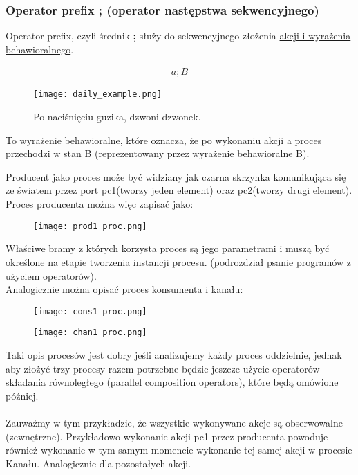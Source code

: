 \documentclass[a4paper,15pt]{article}
\newcommand{\example}[2]{
    \begin{tcolorbox}[colback=blue!5!white,colframe=blue,title={Przykład #1}]
        #2
    \end{tcolorbox}
}
\begin{document}
\newpage
\subsubsection{Operator prefix ; (operator następstwa sekwencyjnego)}
Operator prefix, czyli średnik \textbf{;} służy do sekwencyjnego złożenia \underline{akcji i wyrażenia behawioralnego}.
\example{}{
\begin{align*}
a; B
\end{align*}

\begin{figure}[H]
\centerline{\texttt{[image: daily\_example.png]}}
\caption{Po naciśnięciu guzika, dzwoni dzwonek.}
\label{fig:daily_example}
\end{figure}

To wyrażenie behawioralne, które oznacza, że po wykonaniu akcji a proces przechodzi w stan B (reprezentowany przez wyrażenie behawioralne B).
}

Producent jako proces może być widziany jak czarna skrzynka komunikująca się ze światem przez port pc1(tworzy jeden element) oraz pc2(tworzy drugi element). Proces producenta można więc zapisać jako:
\begin{figure}[H]
\centerline{\texttt{[image: prod1\_proc.png]}}
\label{fig:prod1_proc}
\end{figure}
Właściwe bramy z których korzysta proces są jego parametrami i muszą być określone na etapie tworzenia instancji procesu. (podrozdział psanie programów z użyciem operatorów). \\
Analogicznie można opisać proces konsumenta i kanału:
\begin{figure}[H]
\centerline{\texttt{[image: cons1\_proc.png]}}
\label{fig:cons1_proc}
\end{figure}
\begin{figure}[H]
\centerline{\texttt{[image: chan1\_proc.png]}}
\label{fig:chan1_proc}
\end{figure}
Taki opis procesów jest dobry jeśli analizujemy każdy proces oddzielnie, jednak aby złożyć trzy procesy razem potrzebne będzie jeszcze użycie operatorów składania równoległego (parallel composition operators), które będą omówione później. \\ \\
Zauważmy w tym przykładzie, że wszystkie wykonywane akcje są obserwowalne (zewnętrzne). Przykładowo wykonanie akcji pc1 przez producenta powoduje również wykonanie w tym samym momencie wykonanie tej samej akcji w procesie Kanału. Analogicznie dla pozostałych akcji.
\end{document}
